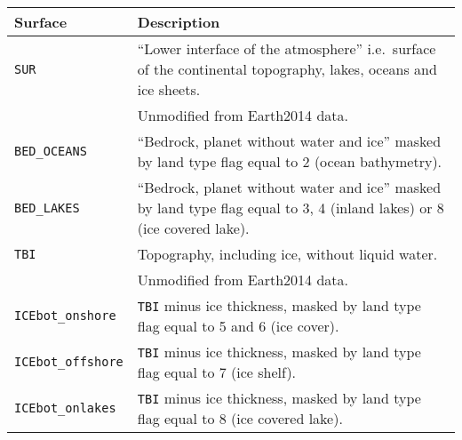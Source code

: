 \begin{tabular}{lp{}}
    \toprule   
    \textbf{Surface} & \textbf{Description} \\
    \midrule
    \texttt{SUR} &
    ``Lower interface of the atmosphere'' i.e.~surface of the continental topography, lakes, oceans and ice sheets. \\
    & Unmodified from Earth2014 data. \\
    \texttt{BED\_OCEANS} &
    ``Bedrock, planet without water and ice'' masked by land type flag equal to 2 (ocean bathymetry). \\
    \texttt{BED\_LAKES} &
    ``Bedrock, planet without water and ice'' masked by land type flag equal to 3, 4 (inland lakes) or 8 (ice covered lake). \\
    \texttt{TBI} &
    Topography, including ice, without liquid water. \\
    & Unmodified from Earth2014 data. \\
    \texttt{ICEbot\_onshore} &
    \texttt{TBI} minus ice thickness, masked by land type flag equal to 5 and 6 (ice cover). \\
    \texttt{ICEbot\_offshore} &
    \texttt{TBI} minus ice thickness, masked by land type flag equal to 7 (ice shelf).  \\
    \texttt{ICEbot\_onlakes} &
    \texttt{TBI} minus ice thickness, masked by land type flag equal to 8 (ice covered lake).  \\
    \bottomrule
\end{tabular}